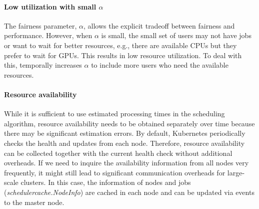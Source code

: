 \paragraph{Low utilization with small $\alpha$ }
The fairness parameter, $\alpha$, allows the explicit tradeoff between fairness and performance.
However, when $\alpha$ is small, the small set of users may not have jobs or want to wait for better resources, e.g., there are available CPUs but they prefer to wait for GPUs.
This results in low resource utilization.
To deal with this, \name temporally increases $\alpha$ to include more users who need the available resources.

\paragraph{Resource availability}
While it is sufficient to use estimated processing times in the scheduling algorithm, resource availability needs to be obtained separately over time because there may be significant estimation errors. 
By default, Kubernetes periodically checks the health and updates from each node. Therefore, resource availability can be collected together with the current health check without additional overheads. %
If we need to inquire the availability information from all nodes very frequently, it might still lead to significant communication overheads for large-scale clusters. In this case, the information of nodes and jobs (\textit{schedulercache.NodeInfo}) are cached in each node and can be updated via events to the master node. 


